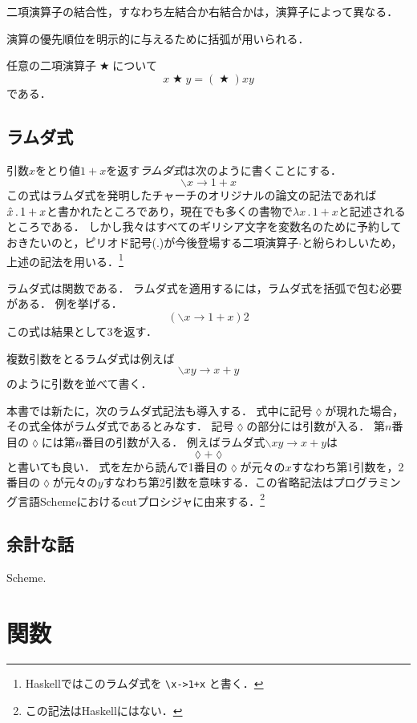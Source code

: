 \documentclass[twocolumn]{jsbook}
\newcommand{\mathAnyBinaryOperator}{\mathop{\bigstar}}
\newcommand{\mathLambda}{\backslash}
\newcommand{\mathLambdaAnonymousParameter}{\lozenge}
\newcommand{\mathLambdaExpression}[2]{\mathLambda#1\rightarrow#2}
\newcommand{\keyword}[1]{\emph{#1}}
\newcommand{\code}[1]{\texttt{#1}}
\newenvironment{point}{\begin{screen}}{\end{screen}}
\begin{document}
二項演算子の結合性，すなわち左結合か右結合かは，演算子によって異なる．

演算の優先順位を明示的に与えるために括弧が用いられる．

\begin{point}
任意の二項演算子$\mathAnyBinaryOperator$について$$x\mathAnyBinaryOperator y=(\mathAnyBinaryOperator)xy$$である．
\end{point}

\section{ラムダ式}
引数$x$をとり値$1+x$を返す\keyword{ラムダ式}は次のように書くことにする．
$$\mathLambdaExpression{x}{1+x}$$
この式はラムダ式を発明したチャーチのオリジナルの論文の記法であれば$\Hat x\,.\,1+x$と書かれたところであり，現在でも多くの書物で$\lambda x\,.\,1+x$と記述されるところである．
しかし我々はすべてのギリシア文字を変数名のために予約しておきたいのと，ピリオド記号($.$)が今後登場する二項演算子$\cdot$と紛らわしいため，上述の記法を用いる．\footnote{Haskellではこのラムダ式を \code{\textbackslash x->1+x} と書く．}

ラムダ式は関数である．
ラムダ式を適用するには，ラムダ式を括弧で包む必要がある．
例を挙げる．
$$\left(\mathLambdaExpression{x}{1+x}\right)2$$
この式は結果として$3$を返す．

複数引数をとるラムダ式は例えば$$\mathLambdaExpression{xy}{x+y}$$のように引数を並べて書く．

本書では新たに，次のラムダ式記法も導入する．
式中に記号$\mathLambdaAnonymousParameter$が現れた場合，その式全体がラムダ式であるとみなす．
記号$\mathLambdaAnonymousParameter$の部分には引数が入る．
第$n$番目の$\mathLambdaAnonymousParameter$には第$n$番目の引数が入る．
例えばラムダ式$\mathLambdaExpression{xy}{x+y}$は$$\mathLambdaAnonymousParameter+\mathLambdaAnonymousParameter$$と書いても良い．
式を左から読んで1番目の$\mathLambdaAnonymousParameter$が元々の$x$すなわち第1引数を，2番目の$\mathLambdaAnonymousParameter$が元々の$y$すなわち第2引数を意味する．この省略記法はプログラミング言語Schemeにおけるcutプロシジャに由来する．\footnote{この記法はHaskellにはない．}

\section*{余計な話}

Scheme.

\chapter{関数}
\end{document}

